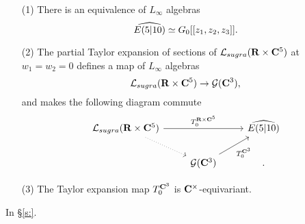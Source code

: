 \begin{lem}
\begin{itemize}
\item[(1)]
There is an equivalence of $L_\infty$ algebras
\[
\Hat{E(5|10)} \simeq G_0 [[z_1,z_2,z_3]] .
\]
\item[(2)]The partial Taylor expansion of sections of $\cL_{sugra}(\R \times \C^5)$ at $w_1=w_2 = 0$ defines a map of $L_\infty$ algebras 
\[
\cL_{sugra}(\R \times \C^5) \to \cG(\C^3) ,
\]
and makes the following diagram commute
\[
\begin{tikzcd}
\cL_{sugra}(\R \times \C^5) \ar[dr,dotted] \ar[rr,"T_0^{\R \times \C^5}"] & &  \Hat{E(5|10)} \\ 
& \cG(\C^3) \ar[ur,"T_0^{\C^3}"'] & .
\end{tikzcd} 
\]
\item[(3)] 
The Taylor expansion map $T_0^{\C^3}$ is $\C^\times$-equivariant. 
\end{itemize}
\end{lem}


In \S \ref{s:}. 


%

